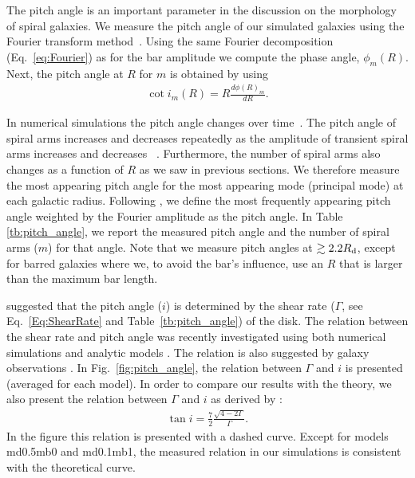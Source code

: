 The pitch angle is an important parameter in the discussion on the morphology 
of spiral galaxies.  We measure the pitch angle of our simulated 
galaxies using the Fourier transform method~\citep[see ][]{2013A&A...553A..77G, 2015MNRAS.454.2954B}.
Using the same Fourier decomposition (Eq.~\ref{eq:Fourier}) as for 
the bar amplitude we compute the phase angle,  $\phi_m(R)$.
Next, the pitch angle at $R$ for $m$ is obtained by using
\begin{eqnarray}
\cot i_m(R) = R\frac{d\phi (R)_m}{dR}.
\end{eqnarray}


In numerical simulations the pitch angle changes over
time~\citep{2013ApJ...763...46B, 2013A&A...553A..77G, 2015MNRAS.454.2954B}.
The pitch angle of spiral arms increases and
decreases repeatedly as the amplitude of transient spiral arms
increases and decreases \mbox{~\citep[see Figures 4 and 5
  in][]{2015MNRAS.454.2954B}}. Furthermore, the number of spiral arms also 
changes as a function of $R$ as we saw in previous sections. We 
therefore measure the most appearing pitch angle for the most 
appearing mode (principal mode) at each galactic radius.  
Following \citet{2015MNRAS.454.2954B},
we define the most frequently appearing pitch angle weighted by the
Fourier amplitude as the pitch angle. 
In Table \ref{tb:pitch_angle}, we report the measured
pitch angle and the number of spiral arms ($m$) for that angle.  
Note that we measure pitch angles at $\gtrsim 2.2R_{\rm d}$, 
except for barred galaxies where we, to avoid the bar's influence,
use an $R$ that is larger than the maximum bar length.

\citet{1966ApJ...146..810J} suggested that the pitch 
angle ($i$) is determined by the shear rate ($\Gamma$, see Eq.~\ref{Eq:ShearRate} and 
Table~\ref{tb:pitch_angle}) of the disk. The relation 
between the shear rate and pitch angle was recently investigated 
using both numerical simulations and analytic models 
\citep{2014ApJ...787..174M,2016ApJ...821...35M}.
The relation is also suggested by galaxy observations 
\citep{2005MNRAS.361L..20S,2006ApJ...645.1012S}.
In Fig.~\ref{fig:pitch_angle}, the relation between $\Gamma$
and $i$ is presented (averaged for each model). 
In order to compare our results with the theory, we also
present the relation between $\Gamma$ and $i$ as derived 
by \citep{2014ApJ...787..174M}:
\begin{eqnarray}
\tan i = \frac{7}{2}\frac{\sqrt{4-2\Gamma}}{\Gamma}.
\label{eq:pitch_shear}
\end{eqnarray}
In the figure this relation is presented with a dashed curve.
Except for models md0.5mb0 and md0.1mb1, the measured relation in our 
simulations is consistent with the theoretical curve.

